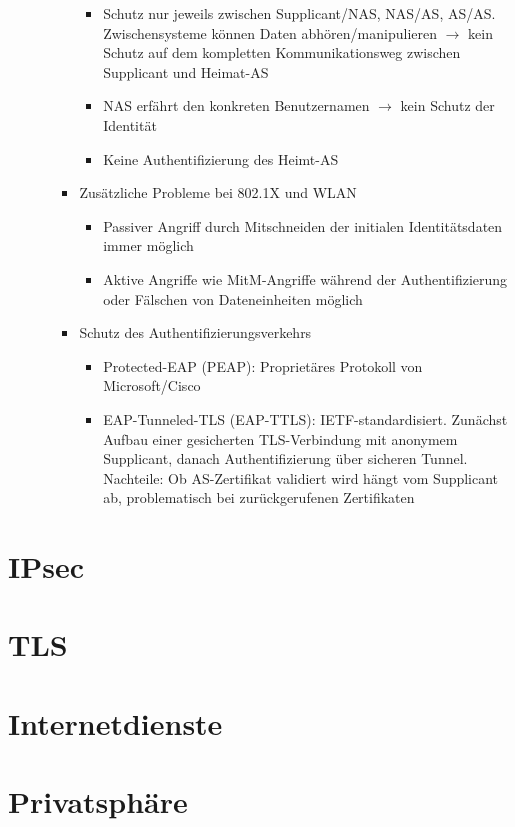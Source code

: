 \begin{itemize}
\begin{itemize}
\begin{itemize}
			\begin{itemize}
				\item Schutz nur jeweils zwischen Supplicant/NAS, NAS/AS, AS/AS. Zwischensysteme können Daten abhören/manipulieren \(\rightarrow\) kein Schutz auf dem kompletten Kommunikationsweg zwischen Supplicant und Heimat-AS
				\item NAS erfährt den konkreten Benutzernamen \(\rightarrow\) kein Schutz der Identität
				\item Keine Authentifizierung des Heimt-AS
			\end{itemize}
			\item Zusätzliche Probleme bei 802.1X und WLAN
			\begin{itemize}
				\item Passiver Angriff durch Mitschneiden der initialen Identitätsdaten immer möglich
				\item Aktive Angriffe wie MitM-Angriffe während der Authentifizierung oder Fälschen von Dateneinheiten möglich
			\end{itemize}
			\item Schutz des Authentifizierungsverkehrs
			\begin{itemize}
				\item Protected-EAP (PEAP): Proprietäres Protokoll von Microsoft/Cisco
				\item EAP-Tunneled-TLS (EAP-TTLS): IETF-standardisiert. Zunächst Aufbau einer gesicherten TLS-Verbindung mit anonymem Supplicant, danach Authentifizierung über sicheren Tunnel. Nachteile: Ob AS-Zertifikat validiert wird hängt vom Supplicant ab, problematisch bei zurückgerufenen Zertifikaten 
			\end{itemize}
		\end{itemize}
	\end{itemize}
\end{itemize}



\section{IPsec}



\section{TLS}



\section{Internetdienste}



\section{Privatsphäre}
